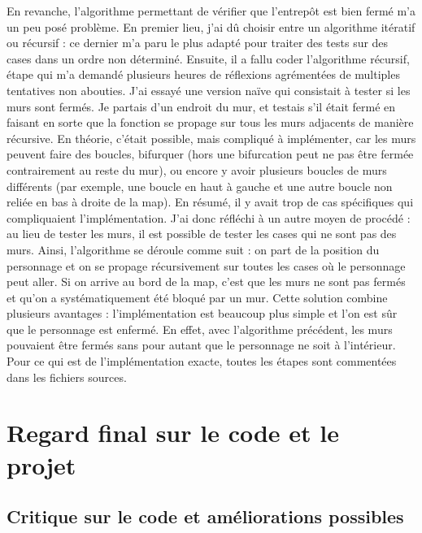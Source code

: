 \documentclass[11pt]{article}
\begin{document}
En revanche, l'algorithme permettant de vérifier que l'entrepôt est bien fermé
m'a un peu posé problème. En premier lieu, j'ai dû choisir entre un algorithme
itératif ou récursif : ce dernier m'a paru le plus adapté pour traiter des tests
sur des cases dans un ordre non déterminé.  Ensuite, il a fallu coder
l'algorithme récursif, étape qui m'a demandé plusieurs heures de réflexions
agrémentées de multiples tentatives non abouties. J'ai essayé une version naïve
qui consistait à tester si les murs sont fermés. Je partais d'un endroit du mur,
et testais s'il était fermé en faisant en sorte que la fonction se propage sur
tous les murs adjacents de manière récursive. En théorie, c'était possible, mais
compliqué à implémenter, car les murs peuvent faire des boucles, bifurquer (hors
une bifurcation peut ne pas être fermée contrairement au reste du mur), ou
encore y avoir plusieurs boucles de murs différents (par exemple, une boucle en
haut à gauche et une autre boucle non reliée en bas à droite de la map). En
résumé, il y avait trop de cas spécifiques qui compliquaient l'implémentation.
J'ai donc réfléchi à un autre moyen de procédé : au lieu de tester les murs, il
est possible de tester les cases qui ne sont pas des murs. Ainsi, l'algorithme
se déroule comme suit : on part de la position du personnage et on se propage
récursivement sur toutes les cases où le personnage peut aller. Si on arrive au
bord de la map, c'est que les murs ne sont pas fermés et qu'on a
systématiquement été bloqué par un mur. Cette solution combine plusieurs
avantages : l'implémentation est beaucoup plus simple et l'on est sûr que le
personnage est enfermé. En effet, avec l'algorithme précédent, les murs
pouvaient être fermés sans pour autant que le personnage ne soit à l'intérieur.
Pour ce qui est de l'implémentation exacte, toutes les étapes sont commentées
dans les fichiers sources.

\section{Regard final sur le code et le projet}

\subsection{Critique sur le code et améliorations possibles}
\end{document}
